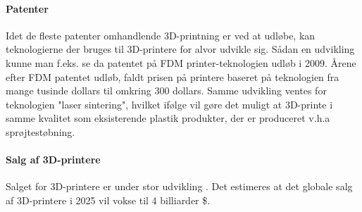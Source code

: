 
\paragraph{Patenter} %

Idet de fleste patenter omhandlende 3D-printning er ved at udløbe, kan teknologierne der bruges til 3D-printere for alvor udvikle sig. Sådan en udvikling kunne man f.eks. se da patentet på FDM printer-teknologien udløb i 2009. \autocite{manyika_disruptive_2013} Årene efter FDM patentet udløb, faldt prisen på printere baseret på teknologien fra mange tusinde dollars til omkring 300 dollars. \autocite{mims_3d_2013} Samme udvikling ventes for teknologien "laser sintering", hvilket ifølge \autocite{mims_3d_2013} vil gøre det muligt at 3D-printe i samme kvalitet som eksisterende plastik produkter, der er produceret v.h.a sprøjtestøbning.





\paragraph{Salg af 3D-printere}

Salget for 3D-printere er under stor udvikling \autocite{wohler_sales_2012}. Det estimeres at det globale salg af 3D-printere i 2025 vil vokse til 4 billiarder \$. \autocite[110]{manyika_disruptive_2013}





